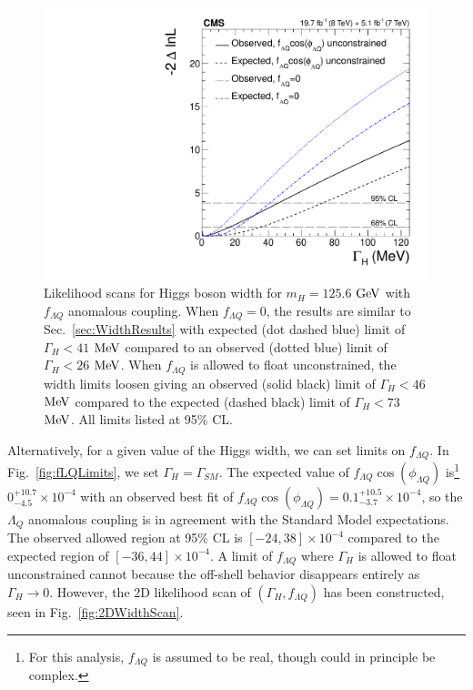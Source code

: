 \begin{figure}[htbp]
\begin{center}
\includegraphics[width=.9\linewidth]{HiggsProperties/figures/width_1DScan_GGsm.pdf}
\caption[Expected and Observed Limits on Higgs Boson Width with Anomalous Coupling]{Likelihood scans for Higgs boson width for $m_{H}=125.6$ $\rm{GeV}$ with $f_{\Lambda Q}$ anomalous coupling. When $f_{\Lambda Q}=0$, the results are similar to Sec.~\ref{sec:WidthResults} with expected (dot dashed blue) limit of $\Gamma_H < 41$ $\rm{MeV}$ compared to an observed (dotted blue) limit of $\Gamma_H < 26$ $\rm{MeV}$. When $f_{\Lambda Q}$ is allowed to float unconstrained, the width limits loosen giving an observed (solid black) limit of $\Gamma_H < 46$ $\rm{MeV}$ compared to the expected (dashed black) limit of $\Gamma_H < 73$ $\rm{MeV}$. All limits listed at 95\% CL.}
\label{fig:WidthLimitsWithfLQ}
\end{center}
\end{figure}

Alternatively, for a given value of the Higgs width, we can set limits on $f_{\Lambda Q}$. In Fig.~\ref{fig:fLQLimits}, we set $\Gamma_{H}=\Gamma_{SM}$. The expected value of $f_{\Lambda Q}\cos(\phi_{\Lambda Q})$ is\footnote{For this analysis, $f_{\Lambda Q}$ is assumed to be real, though could in principle be complex.} $0 ^{+10.7}_{-4.5} \times 10^{-4}$ with an observed best fit of $f_{\Lambda Q}\cos(\phi_{\Lambda Q}) = 0.1 ^{+10.5}_{-3.7} \times 10^{-4}$, so the $\Lambda_{Q}$ anomalous coupling is in agreement with the Standard Model expectations. The observed allowed region at 95\% CL is $[-24,38]\times 10^{-4}$ compared to the expected region of $[-36,44] \times 10^{-4}$. A limit of $f_{\Lambda Q}$ where $\Gamma_H$ is allowed to float unconstrained cannot because the off-shell behavior disappears entirely as $\Gamma_{H}\rightarrow0$. However, the 2D likelihood scan of $(\Gamma_{H},f_{\Lambda Q})$ has been constructed, seen in Fig.~\ref{fig:2DWidthScan}.

